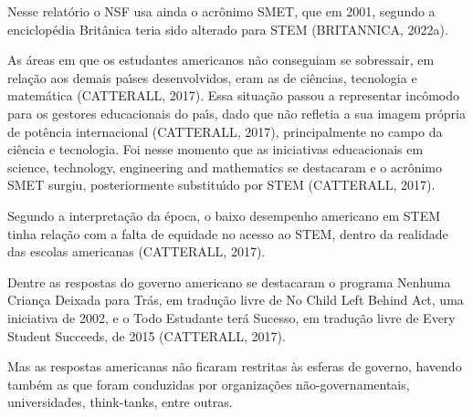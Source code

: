 \documentclass[
12pt,		%
openright,	%
twoside,  %
a4paper,			%
chapter=TITLE,		%
english,			%
french,				%
spanish,			%
brazil				%
]{USPSC-classe/USPSC}
\begin{document}
Nesse relat\'orio o NSF usa ainda o acr\^onimo SMET, que em 2001, segundo a enciclop\'edia Brit\^anica teria sido alterado para STEM  (BRITANNICA, 2022a).









As \'areas em que os estudantes americanos n\~ao conseguiam se sobressair, em rela\c{c}\~ao aos demais pa\'{\i}ses desenvolvidos, eram as de ci\^encias, tecnologia e matem\'atica  (CATTERALL, 2017). Essa situa\c{c}\~ao passou a representar inc\^omodo para os gestores educacionais do pa\'{\i}s, dado que n\~ao refletia a sua imagem pr\'opria de pot\^encia internacional  (CATTERALL, 2017), principalmente no campo da ci\^encia e tecnologia. Foi nesse momento que as iniciativas educacionais em \textquotedbl science, technology, engineering and mathematics se destacaram e o acr\^onimo SMET surgiu, posteriormente substitu\'{\i}do por STEM  (CATTERALL, 2017).









Segundo a interpreta\c{c}\~ao da \'epoca, o baixo desempenho americano em STEM tinha rela\c{c}\~ao com a falta de equidade no acesso ao STEM, dentro da realidade das escolas americanas  (CATTERALL, 2017).









Dentre as respostas do governo americano se destacaram o programa \textquotedbl Nenhuma Crian\c{c}a Deixada para Tr\'as, em tradu\c{c}\~ao livre de \textquotedbl No Child Left Behind Act, uma iniciativa de 2002, e o \textquotedbl Todo Estudante ter\'a Sucesso, em tradu\c{c}\~ao livre de \textquotedbl Every Student Succeeds, de 2015  (CATTERALL, 2017).









Mas as respostas americanas n\~ao ficaram restritas \`as esferas de governo, havendo tamb\'em as que foram conduzidas por organiza\c{c}\~oes n\~ao-governamentais, universidades, think-tanks, entre outras.
\end{document}
